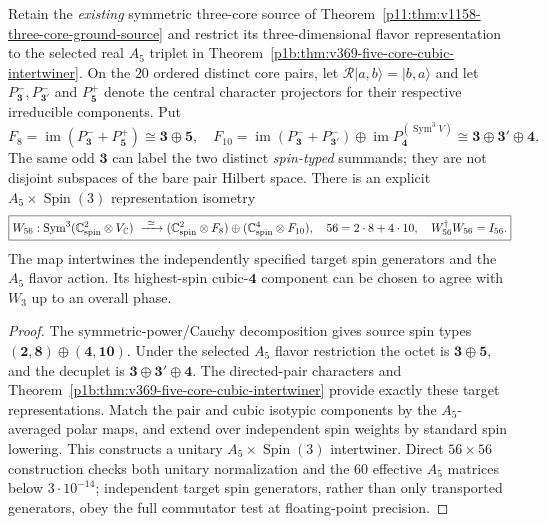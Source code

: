 \documentclass[12pt,a4paper]{article}
\begin{document}
\begin{theorem}
\label{p11:thm:v369-five-core-baryon-chart}
Retain the \emph{existing} symmetric three-core source of
Theorem~\ref{p11:thm:v1158-three-core-ground-source} and restrict its
three-dimensional flavor representation to the selected real $A_5$
triplet in Theorem~\ref{p1b:thm:v369-five-core-cubic-intertwiner}.
On the $20$ ordered distinct core pairs, let $\mathcal R|a,b\rangle
=|b,a\rangle$ and let $P_{\mathbf3}^{-},P_{\mathbf3'}^{-}$ and
$P_{\mathbf5}^{+}$ denote the central character projectors for their
respective irreducible components.  Put
\[
 F_8=\operatorname{im}(P_{\mathbf3}^{-}+P_{\mathbf5}^{+})
 \cong\mathbf3\oplus\mathbf5,\quad
 F_{10}=\operatorname{im}(P_{\mathbf3}^{-}+P_{\mathbf3'}^{-})
 \oplus\operatorname{im}P_{\mathbf4}^{(\operatorname{Sym}^3V)}
 \cong\mathbf3\oplus\mathbf3'\oplus\mathbf4.
\]
The same odd $\mathbf3$ can label the two distinct \emph{spin-typed}
summands; they are not disjoint subspaces of the bare pair Hilbert
space.  There is an explicit $A_5\times\operatorname{Spin}(3)$
representation isometry
\[
 \boxed{W_{56}:\operatorname{Sym}^3(\mathbb C^2_{\rm spin}
 \otimes V_{\mathbb C})\ \xrightarrow{\ \simeq\ }
 (\mathbb C^2_{\rm spin}\otimes F_8)
 \oplus(\mathbb C^4_{\rm spin}\otimes F_{10}),\quad
 56=2\cdot8+4\cdot10,\quad W_{56}^\dagger W_{56}=I_{56}.}
\]
The map intertwines the independently specified target spin generators
and the $A_5$ flavor action.  Its highest-spin cubic-$\mathbf4$
component can be chosen to agree with $W_3$ up to an overall phase.
\end{theorem}
\begin{proof}
The symmetric-power/Cauchy decomposition gives source spin types
$(\mathbf2,\mathbf8)\oplus(\mathbf4,\mathbf{10})$.
Under the selected $A_5$ flavor restriction the octet is
$\mathbf3\oplus\mathbf5$, and the decuplet is
$\mathbf3\oplus\mathbf3'\oplus\mathbf4$.  The directed-pair
characters and Theorem~\ref{p1b:thm:v369-five-core-cubic-intertwiner}
provide exactly these target representations.  Match the pair and
cubic isotypic components by the $A_5$-averaged polar maps, and extend
over independent spin weights by standard spin lowering.  This
constructs a unitary $A_5\times\operatorname{Spin}(3)$ intertwiner.
Direct $56\times56$ construction checks both unitary normalization and
the $60$ effective $A_5$ matrices below $3\cdot10^{-14}$; independent
target spin generators, rather than only transported generators, obey
the full commutator test at floating-point precision.
\end{proof}
\end{document}
